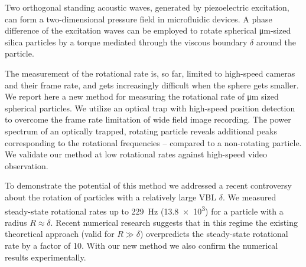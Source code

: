 Two orthogonal standing acoustic waves, generated by piezoelectric excitation, 
can form a two-dimensional pressure field in microfluidic devices. A phase 
difference of the excitation waves can be employed to rotate spherical 
\si{\micro\meter}-sized silica particles by a torque mediated through the 
viscous boundary $\delta$ around the particle.

The measurement of the rotational rate is, so far, limited to high-speed cameras 
and their frame rate, and gets increasingly difficult when the sphere gets 
smaller.  We report here a new method for measuring the rotational rate of 
\si{\micro\meter} sized spherical particles. We utilize an optical trap with 
high-speed position detection to overcome the frame rate limitation of wide 
field image recording. The power spectrum of an optically trapped, rotating 
particle reveals additional peaks corresponding to the rotational frequencies -- 
compared to a non-rotating particle. We validate our method at low rotational 
rates against high-speed video observation. 

To demonstrate the potential of this method we addressed a recent controversy 
about the rotation of particles with a relatively large VBL 
$\delta$. We measured steady-state rotational rates up to \SI{229}{\hertz} 
(\SI{13.8e3}{\rpm}) for a particle with a radius $R \approx \delta$.  Recent 
numerical research suggests that in this regime the existing theoretical 
approach (valid for $R\gg\delta$) overpredicts the steady-state rotational rate 
by a factor of 10.  With our new method we also confirm the numerical results 
experimentally.
